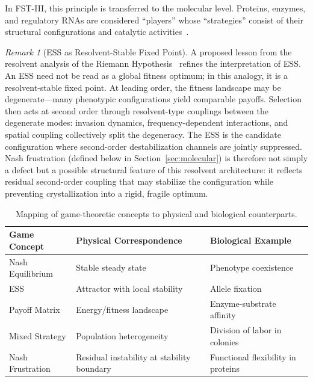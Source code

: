 \documentclass[12pt,a4paper]{article}
\theoremstyle{remark}
\newtheorem{remark}{Remark}
\begin{document}
In FST-III, this principle is transferred to the molecular level. Proteins, enzymes, and regulatory RNAs are considered ``players'' whose ``strategies'' consist of their structural configurations and catalytic activities~\citep{GameBiochemistry}.

\begin{remark}[ESS as Resolvent-Stable Fixed Point]
\label{rem:ess-resolvent}
A proposed lesson from the resolvent analysis of the Riemann Hypothesis~\citep{GeigerRH2026b} refines the interpretation of ESS. An ESS need not be read as a global fitness optimum; in this analogy, it is a resolvent-stable fixed point. At leading order, the fitness landscape may be degenerate---many phenotypic configurations yield comparable payoffs. Selection then acts at second order through resolvent-type couplings between the degenerate modes: invasion dynamics, frequency-dependent interactions, and spatial coupling collectively split the degeneracy. The ESS is the candidate configuration where second-order destabilization channels are jointly suppressed. Nash frustration (defined below in Section~\ref{sec:molecular}) is therefore not simply a defect but a possible structural feature of this resolvent architecture: it reflects residual second-order coupling that may stabilize the configuration while preventing crystallization into a rigid, fragile optimum.
\end{remark}

\begin{table}[htbp]
\centering
\caption{Mapping of game-theoretic concepts to physical and biological counterparts.}
\label{tab:game-biology-mapping}
\begin{tabularx}{\textwidth}{@{}L{0.18\textwidth} L{0.29\textwidth} Y@{}}
\toprule
\textbf{Game Concept} & \textbf{Physical Correspondence} & \textbf{Biological Example} \\
\midrule
Nash Equilibrium & Stable steady state & Phenotype coexistence \\
ESS & Attractor with local stability & Allele fixation \\
Payoff Matrix & Energy/fitness landscape & Enzyme-substrate affinity \\
Mixed Strategy & Population heterogeneity & Division of labor in colonies \\
Nash Frustration & Residual instability at stability boundary & Functional flexibility in proteins \\
\bottomrule
\end{tabularx}
\end{table}
\end{document}
